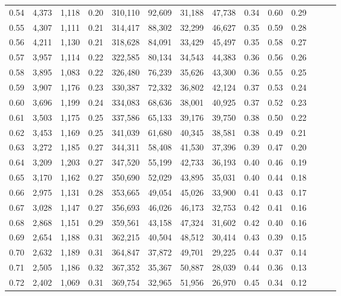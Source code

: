 \begin{tabular}{rrrrrrrrrrrrrr}
0.54 &  4,373 &  1,118 &  0.20 &  310,110 &   92,609 &  31,188 &  47,738 &  0.34 &  0.60 &      0.29 \\
0.55 &  4,307 &  1,111 &  0.21 &  314,417 &   88,302 &  32,299 &  46,627 &  0.35 &  0.59 &      0.28 \\
0.56 &  4,211 &  1,130 &  0.21 &  318,628 &   84,091 &  33,429 &  45,497 &  0.35 &  0.58 &      0.27 \\
0.57 &  3,957 &  1,114 &  0.22 &  322,585 &   80,134 &  34,543 &  44,383 &  0.36 &  0.56 &      0.26 \\
0.58 &  3,895 &  1,083 &  0.22 &  326,480 &   76,239 &  35,626 &  43,300 &  0.36 &  0.55 &      0.25 \\
0.59 &  3,907 &  1,176 &  0.23 &  330,387 &   72,332 &  36,802 &  42,124 &  0.37 &  0.53 &      0.24 \\
0.60 &  3,696 &  1,199 &  0.24 &  334,083 &   68,636 &  38,001 &  40,925 &  0.37 &  0.52 &      0.23 \\
0.61 &  3,503 &  1,175 &  0.25 &  337,586 &   65,133 &  39,176 &  39,750 &  0.38 &  0.50 &      0.22 \\
0.62 &  3,453 &  1,169 &  0.25 &  341,039 &   61,680 &  40,345 &  38,581 &  0.38 &  0.49 &      0.21 \\
0.63 &  3,272 &  1,185 &  0.27 &  344,311 &   58,408 &  41,530 &  37,396 &  0.39 &  0.47 &      0.20 \\
0.64 &  3,209 &  1,203 &  0.27 &  347,520 &   55,199 &  42,733 &  36,193 &  0.40 &  0.46 &      0.19 \\
0.65 &  3,170 &  1,162 &  0.27 &  350,690 &   52,029 &  43,895 &  35,031 &  0.40 &  0.44 &      0.18 \\
0.66 &  2,975 &  1,131 &  0.28 &  353,665 &   49,054 &  45,026 &  33,900 &  0.41 &  0.43 &      0.17 \\
0.67 &  3,028 &  1,147 &  0.27 &  356,693 &   46,026 &  46,173 &  32,753 &  0.42 &  0.41 &      0.16 \\
0.68 &  2,868 &  1,151 &  0.29 &  359,561 &   43,158 &  47,324 &  31,602 &  0.42 &  0.40 &      0.16 \\
0.69 &  2,654 &  1,188 &  0.31 &  362,215 &   40,504 &  48,512 &  30,414 &  0.43 &  0.39 &      0.15 \\
0.70 &  2,632 &  1,189 &  0.31 &  364,847 &   37,872 &  49,701 &  29,225 &  0.44 &  0.37 &      0.14 \\
0.71 &  2,505 &  1,186 &  0.32 &  367,352 &   35,367 &  50,887 &  28,039 &  0.44 &  0.36 &      0.13 \\
0.72 &  2,402 &  1,069 &  0.31 &  369,754 &   32,965 &  51,956 &  26,970 &  0.45 &  0.34 &      0.12 \\

\end{tabular}
